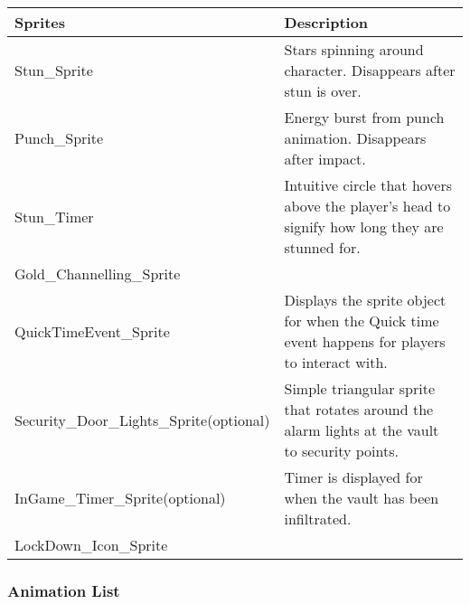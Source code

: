 \documentclass[14pt]{report}
\begin{document}
\begin{tabular}{| p{.4\linewidth} | p{.4\linewidth} |}
    \hline 
    Sprites     &   Description  \\ \hline
    Stun\_Sprite     &   Stars spinning around character. Disappears after stun is over.  \\ \hline
    Punch\_Sprite    &   Energy burst from punch animation. Disappears after impact.   \\ \hline
    Stun\_Timer  &   Intuitive circle that hovers above the player’s head to signify how long they are stunned for.   \\ \hline
    Gold\_Channelling\_Sprite   &  \\ \hline
    QuickTimeEvent\_Sprite   &     Displays the sprite object for when the Quick time event happens for players to interact with.  \\ \hline
    Security\_Door\_Lights\_Sprite(optional)   &   Simple triangular sprite that rotates around the alarm lights at the vault to security points.  \\ \hline
    InGame\_Timer\_Sprite(optional)   &   Timer is displayed for when the vault has been infiltrated.   \\ \hline
    LockDown\_Icon\_Sprite    &       \\
    \hline
\end{tabular}

\subsubsection{Animation List}
\end{document}
